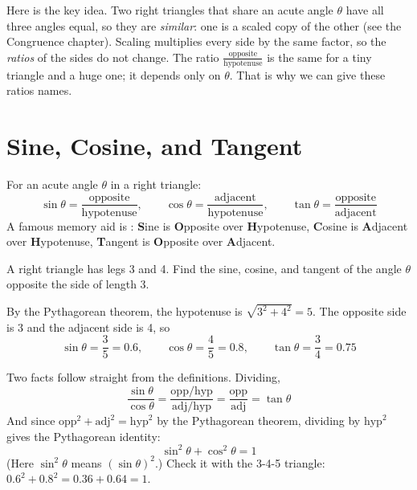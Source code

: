 Here is the key idea. Two right triangles that share an acute angle $\theta$ have
all three angles equal, so they are \emph{similar}: one is a scaled copy of the
other (see the Congruence chapter). Scaling multiplies every side by the same
factor, so the \emph{ratios} of the sides do not change. The ratio
$\frac{\text{opposite}}{\text{hypotenuse}}$ is the same for a tiny triangle and a
huge one; it depends only on $\theta$. That is why we can give these ratios names.

\section{Sine, Cosine, and Tangent}

For an acute angle $\theta$ in a right triangle:
$$\sin\theta = \frac{\text{opposite}}{\text{hypotenuse}}, \qquad
\cos\theta = \frac{\text{adjacent}}{\text{hypotenuse}}, \qquad
\tan\theta = \frac{\text{opposite}}{\text{adjacent}}$$
A famous memory aid is : \textbf{S}ine is
\textbf{O}pposite over \textbf{H}ypotenuse, \textbf{C}osine is \textbf{A}djacent
over \textbf{H}ypotenuse, \textbf{T}angent is \textbf{O}pposite over
\textbf{A}djacent.

\begin{Worked}
\begin{Problem}
A right triangle has legs 3 and 4. Find the sine, cosine, and
tangent of the angle $\theta$ opposite the side of length 3.
\end{Problem}
\begin{Solution}
By the Pythagorean theorem, the hypotenuse is
$\sqrt{3^2 + 4^2} = 5$. The opposite side is 3 and the adjacent side is 4, so
$$\sin\theta = \frac{3}{5} = 0.6, \qquad \cos\theta = \frac{4}{5} = 0.8, \qquad \tan\theta = \frac{3}{4} = 0.75$$
\end{Solution}
\end{Worked}

Two facts follow straight from the definitions. Dividing,
$$\frac{\sin\theta}{\cos\theta} = \frac{\text{opp}/\text{hyp}}{\text{adj}/\text{hyp}} = \frac{\text{opp}}{\text{adj}} = \tan\theta$$
And since $\text{opp}^2 + \text{adj}^2 = \text{hyp}^2$ by the Pythagorean theorem,
dividing by $\text{hyp}^2$ gives the Pythagorean identity:
$$\sin^2\theta + \cos^2\theta = 1$$
(Here $\sin^2\theta$ means $(\sin\theta)^2$.) Check it with the 3-4-5 triangle:
$0.6^2 + 0.8^2 = 0.36 + 0.64 = 1$.

